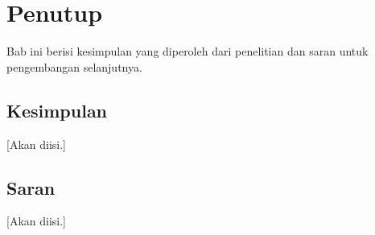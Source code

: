 \chapter{Penutup}
\label{bab:5}
Bab ini berisi kesimpulan yang diperoleh dari penelitian dan saran untuk pengembangan selanjutnya.

\section{Kesimpulan}
[Akan diisi.]

\section{Saran}
[Akan diisi.]
